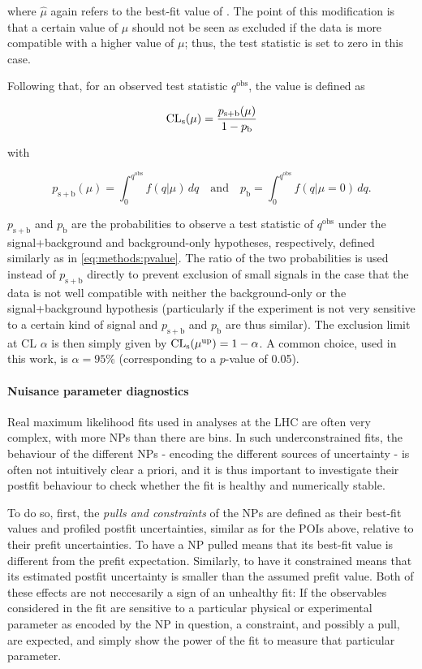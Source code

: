 \noindent where $\hat{\mu}$ again refers to the best-fit value of \mu. The point of this modification is that a certain value of $\mu$ should not be seen as excluded if the data is more compatible with a higher value of $\mu$; thus, the test statistic is set to zero in this case.

Following that, for an observed test statistic $q^{\mathrm{obs}}$, the \CLs value is defined as

\begin{equation}
    \mathrm{CL}_{\mathrm{s}} (\mu) = \frac { p_{\mathrm{s+b}} (\mu) } { 1 - p_{\mathrm{b}} }
\end{equation}

\noindent with

\begin{equation}
    p_{\mathrm{s+b}} (\mu) = \int_0^{q^{\mathrm{obs}}} f(q | \mu) \, dq
    \quad \text{and} \quad
    p_{\mathrm{b}} = \int_0^{q^{\mathrm{obs}}} f(q | \mu = 0) \, dq.
\end{equation}

$p_{\mathrm{s+b}}$ and $p_{\mathrm{b}}$ are the probabilities to observe a test statistic of $q^{\mathrm{obs}}$ under the signal+background and background-only hypotheses, respectively, defined similarly as in \cref{eq:methods:pvalue}. The ratio of the two probabilities is used instead of $p_{\mathrm{s+b}}$ directly to prevent exclusion of small signals in the case that the data is not well compatible with neither the background-only or the signal+background hypothesis (particularly if the experiment is not very sensitive to a certain kind of signal and $p_{\mathrm{s+b}}$ and $p_{\mathrm{b}}$ are thus similar). The exclusion limit at CL $\alpha$ is then simply given by $\mathrm{CL}_{\mathrm{s}} (\mu^{\mathrm{up}}) = 1 - \alpha$. A common choice, used in this work, is $\alpha = 95\%$ (corresponding to a $p$-value of 0.05).

\paragraph{Nuisance parameter diagnostics}

Real maximum likelihood fits used in analyses at the LHC are often very complex, with more NPs than there are bins. In such underconstrained fits, the behaviour of the different NPs - encoding the different sources of uncertainty - is often not intuitively clear a priori, and it is thus important to investigate their postfit behaviour to check whether the fit is healthy and numerically stable.

To do so, first, the \textit{pulls and constraints} of the NPs are defined as their best-fit values and profiled postfit uncertainties, similar as for the POIs above, relative to their prefit uncertainties. To have a NP pulled means that its best-fit value is different from the prefit expectation. Similarly, to have it constrained means that its estimated postfit uncertainty is smaller than the assumed prefit value. Both of these effects are not neccesarily a sign of an unhealthy fit: If the observables considered in the fit are sensitive to a particular physical or experimental parameter as encoded by the NP in question, a constraint, and possibly a pull, are expected, and simply show the power of the fit to measure that particular parameter.

